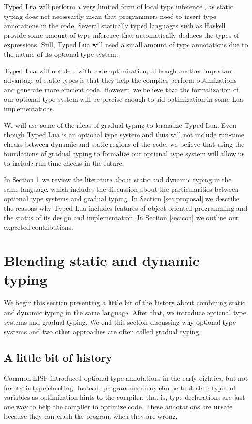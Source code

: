 \documentclass[preprint]{sig-alternate}
\begin{document}
Typed Lua will perform a very limited form of local type inference
\cite{pierce2000lti}, as static typing does not necessarily mean
that programmers need to insert type annotations in the code.
Several statically typed languages such as Haskell provide some
amount of type inference that automatically deduces the types of
expressions.
Still, Typed Lua will need a small amount of type annotations due
to the nature of its optional type system.

Typed Lua will not deal with code optimization, although another
important advantage of static types is that they help the compiler
perform optimizations and generate more efficient code.
However, we believe that the formalization of our optional type
system will be precise enough to aid optimization in some Lua
implementations.

We will use some of the ideas of gradual typing to formalize Typed Lua.
Even though Typed Lua is an optional type system and thus will not
include run-time checks between dynamic and static regions of the
code, we believe that using the foundations of gradual typing to
formalize our optional type system will allow us to include run-time
checks in the future.

In Section \ref{sec:review} we review the literature about static and
dynamic typing in the same language, which includes the discussion
about the particularities between optional type systems and gradual
typing.
In Section \ref{sec:proposal} we describe the reasons why Typed Lua
includes features of object-oriented programming and the status of
its design and implementation.
In Section \ref{sec:con} we outline our expected contributions.

\section{Blending static and dynamic typing} \label{sec:review}

We begin this section presenting a little bit of the history about
combining static and dynamic typing in the same language.
After that, we introduce optional type systems and gradual typing.
We end this section discussing why optional type systems and two
other approaches are often called gradual typing.

\subsection{A little bit of history}

Common LISP \cite{steele1982ocl} introduced optional type annotations
in the early eighties, but not for static type checking.
Instead, programmers may choose to declare types of variables as
optimization hints to the compiler, that is, type declarations are
just one way to help the compiler to optimize code.
These annotations are unsafe because they can crash the program
when they are wrong.
\end{document}
